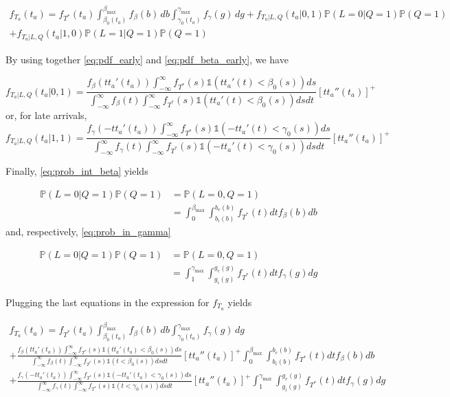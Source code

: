 \documentclass{article}
\begin{document}
\begin{multline*}
  f_{T_a}(t_a) = f_{T^*}(t_a)\int_{\beta_0(t_a)}^{\beta_\text{max}}f_\beta(b)\, db\int_{\gamma_0(t_a)}^{\gamma_\text{max}}f_\gamma(g)\, dg + f_{T_a | L, Q}(t_a | 0, 1) \mathbb{P}(L=0 | Q=1)\mathbb{P}(Q = 1) \\ + f_{T_a | L, Q}(t_a | 1, 0) \mathbb{P}(L=1 | Q=1)\mathbb{P}(Q = 1)
\end{multline*}

By using together \eqref{eq:pdf_early} and \eqref{eq:pdf_beta_early}, we have

\begin{equation*}
  f_{T_a | L, Q}(t_a | 0, 1) = \frac{f_\beta(tt_a'(t_a))\int_{-\infty}^\infty f_{T^*}(s) \mathbb{1}(tt_a'(t) < \beta_0(s)) ds}{\int_{-\infty}^\infty f_\beta(t)\int_{-\infty}^\infty f_{T^*}(s) \mathbb{1}(tt_a'(t) < \beta_0(s)) ds dt}[tt_a''(t_a)]^+ 
\end{equation*}
or, for late arrivals,
\begin{equation*}
  f_{T_a | L, Q}(t_a | 1, 1) = \frac{f_\gamma(-tt_a'(t_a))\int_{-\infty}^\infty f_{T^*}(s) \mathbb{1}(-tt_a'(t) < \gamma_0(s)) ds}{\int_{-\infty}^\infty f_\gamma(t)\int_{-\infty}^\infty f_{T^*}(s) \mathbb{1}(-tt_a'(t) < \gamma_0(s)) ds dt}[tt_a''(t_a)]^+ 
\end{equation*}

Finally, \eqref{eq:prob_int_beta} yields

\begin{align*}
  \mathbb{P}(L=0 | Q=1)\mathbb{P}(Q = 1) & = \mathbb{P}(L=0, Q=1) \\
  & = \int_0^{\beta_\text{max}}\int_{b_i(b)}^{b_e(b)} f_{T^*}(t)dtf_\beta(b)db
\end{align*}
and, respectively, \eqref{eq:prob_in_gamma}

\begin{align*}
  \mathbb{P}(L=0 | Q=1)\mathbb{P}(Q = 1) & = \mathbb{P}(L=0, Q=1) \\
  & = \int_1^{\gamma_\text{max}}\int_{g_i(g)}^{g_e(g)} f_{T^*}(t)dtf_\gamma(g)dg
\end{align*}

Plugging the last equations in the expression for \(f_{T_a}\) yields

\begin{multline}
  \label{eq:final_likelihood}
  f_{T_a}(t_a) = f_{T^*}(t_a)\int_{\beta_0(t_a)}^{\beta_\text{max}}f_\beta(b)\, db\int_{\gamma_0(t_a)}^{\gamma_\text{max}}f_\gamma(g)\, dg \\
  + \frac{f_\beta(tt_a'(t_a))\int_{-\infty}^\infty f_{T^*}(s) \mathbb{1}(tt_a'(t_a) < \beta_0(s)) ds}{\int_{-\infty}^\infty f_\beta(t)\int_{-\infty}^\infty f_{T^*}(s) \mathbb{1}(t < \beta_0(s)) ds dt}[tt_a''(t_a)]^+ \int_0^{\beta_\text{max}}\int_{b_i(b)}^{b_e(b)} f_{T^*}(t)dtf_\beta(b)db \\
  + \frac{f_\gamma(-tt_a'(t_a))\int_{-\infty}^\infty f_{T^*}(s) \mathbb{1}(-tt_a'(t_a) < \gamma_0(s)) ds}{\int_{-\infty}^\infty f_\gamma(t)\int_{-\infty}^\infty f_{T^*}(s) \mathbb{1}(t < \gamma_0(s)) ds dt}[tt_a''(t_a)]^+ \int_1^{\gamma_\text{max}}\int_{g_i(g)}^{g_e(g)} f_{T^*}(t)dtf_\gamma(g)dg
\end{multline}
\end{document}
